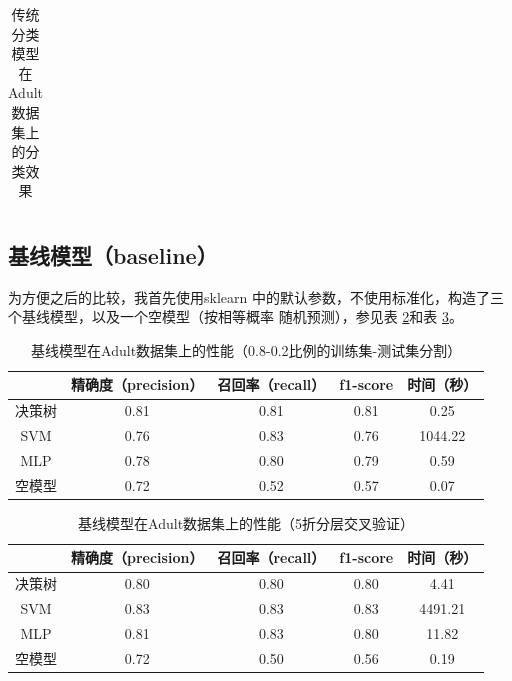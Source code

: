 \documentclass[12pt,a4paper]{article}
\theoremstyle{definition}
\begin{document}
{\begin{table}[H]
\begin{tabular}{c|c}
	\end{tabular}
	\caption{传统分类模型在Adult数据集上的分类效果}
	\label{tab:bench}
\end{table}

\subsection{基线模型（baseline）}

为方便之后的比较，我首先使用sklearn \cite{sklearn}中的默认参数，不使用标准化，构造了三个基线模型，以及一个空模型（按相等概率 随机预测），参见表 \ref{tab:baselines1}和表 \ref{tab:baselines2}。

\begin{table}[H]
	\renewcommand\arraystretch{1.35}
	\caption{基线模型在Adult数据集上的性能（0.8-0.2比例的训练集-测试集分割）}
	\label{tab:baselines1}
	\centering
	
	\begin{tabular}{c|c|c|c|c}
		\centering
		 & 精确度（precision） & 召回率（recall） & f1-score & 时间（秒） \\
		\hline
		\hline
		
		决策树 & 0.81 & 0.81 & 0.81 & 0.25 \\
		SVM & 0.76 & 0.83 & 0.76 & 1044.22 \\
		MLP & 0.78 & 0.80 & 0.79 & 0.59 \\
		空模型 & 0.72 & 0.52 & 0.57 & 0.07 \\

	\end{tabular}
\end{table}

\begin{table}[H]
	\renewcommand\arraystretch{1.35}
	\caption{基线模型在Adult数据集上的性能（5折分层交叉验证）}
	\label{tab:baselines2}
	\centering
	
	\begin{tabular}{c|c|c|c|c}
		\centering
		 & 精确度（precision） & 召回率（recall） & f1-score & 时间（秒） \\
		\hline
		\hline
		
		决策树 & 0.80 & 0.80 & 0.80 & 4.41 \\
		SVM & 0.83 & 0.83 & 0.83 & 4491.21 \\
		MLP & 0.81 & 0.83 & 0.80 & 11.82 \\
		空模型 & 0.72 & 0.50 & 0.56 & 0.19 \\

	\end{tabular}
\end{table}

}
\end{document}
